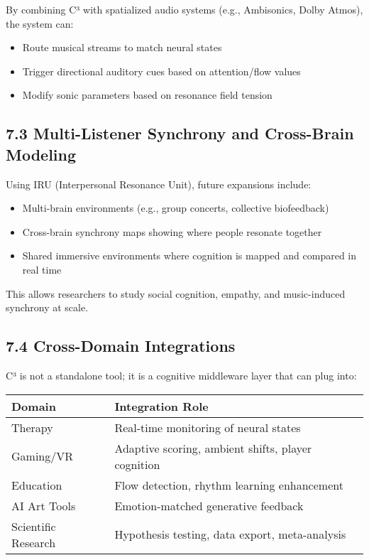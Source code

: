 \documentclass[10pt]{article}
\begin{document}
By combining C³ with spatialized audio systems (e.g., Ambisonics, Dolby Atmos), the system can:

\begin{itemize}
    \item Route musical streams to match neural states
    \item Trigger directional auditory cues based on attention/flow values
    \item Modify sonic parameters based on resonance field tension
\end{itemize}

\subsection*{7.3 Multi-Listener Synchrony and Cross-Brain Modeling}

Using IRU (Interpersonal Resonance Unit), future expansions include:

\begin{itemize}
    \item Multi-brain environments (e.g., group concerts, collective biofeedback)
    \item Cross-brain synchrony maps showing where people resonate together
    \item Shared immersive environments where cognition is mapped and compared in real time
\end{itemize}

This allows researchers to study social cognition, empathy, and music-induced synchrony at scale.

\subsection*{7.4 Cross-Domain Integrations}

C³ is not a standalone tool; it is a cognitive middleware layer that can plug into:

\begin{center}
\begin{tabular}{|l|p{9cm}|}
\hline
\textbf{Domain} & \textbf{Integration Role} \\
\hline
Therapy & Real-time monitoring of neural states \\
Gaming/VR & Adaptive scoring, ambient shifts, player cognition \\
Education & Flow detection, rhythm learning enhancement \\
AI Art Tools & Emotion-matched generative feedback \\
Scientific Research & Hypothesis testing, data export, meta-analysis \\
\hline
\end{tabular}
\end{center}
\end{document}
